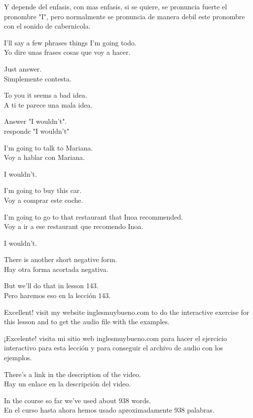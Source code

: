 Y depende del enfasis, con mas enfasis, si se quiere, se pronuncia fuerte
el pronombre "I", pero normalmente se pronuncia de manera debil este pronombre
con el sonido de cabernicola.

I'll say a few phrases things I'm going todo.\\
Yo dire unas frases cosas que voy a hacer.

Just answer.\\
Simplemente contesta.

To you it seems a bad idea.\\
A ti te parece una mala idea.

Answer "I wouldn't".\\
responde "I wouldn't"

I'm going to talk to Mariana.\\
Voy a hablar con Mariana.

I wouldn't.

I'm going to buy this car.\\
Voy a comprar este coche.

I'm going to go to that restaurant that Inoa recommended.\\
Voy a ir a ese restaurant que recomendo Inoa.

I wouldn't.

There is another short negative form.\\
Hay otra forma acortada negativa.

But we'll do that in lesson 143.\\
Pero haremos eso en la lección 143.

Excellent! visit my website inglesmuybueno.com to do the interactive
exercise for this lesson and to get the audio file with the examples.

¡Excelente! visita mi sitio web inglesmuybueno.com para hacer el ejercicio
interactivo para esta lección y para conseguir el archivo de audio con los
ejemplos.

There's a link in the description of the video.\\
Hay un enlace en la descripción del video.

In the course so far we've used about 938 words.\\
En el curso hasta ahora hemos usado aproximadamente 938 palabras.
